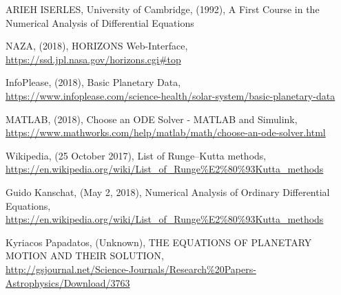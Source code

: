 \documentclass[a4paper]{article}
\begin{document}
\begin{thebibliography}{9}

ARIEH ISERLES, University of Cambridge, (1992), 
A First Course in the Numerical Analysis
of Differential Equations

NAZA, (2018), HORIZONS Web-Interface,
\\\url{https://ssd.jpl.nasa.gov/horizons.cgi#top}

InfoPlease, (2018), Basic Planetary Data,
\\\url{https://www.infoplease.com/science-health/solar-system/basic-planetary-data}

MATLAB, (2018), Choose an ODE Solver - MATLAB and Simulink,
\\\url{https://www.mathworks.com/help/matlab/math/choose-an-ode-solver.html}

Wikipedia, (25 October 2017), List of Runge–Kutta methods,
\\\url{https://en.wikipedia.org/wiki/List_of_Runge%E2%80%93Kutta_methods}

Guido Kanschat, (May 2, 2018), Numerical Analysis of Ordinary Differential Equations,
\\\url{https://en.wikipedia.org/wiki/List_of_Runge%E2%80%93Kutta_methods}

Kyriacos Papadatos, (Unknown), THE EQUATIONS OF PLANETARY MOTION AND THEIR SOLUTION,
\\\url{http://gsjournal.net/Science-Journals/Research%20Papers-Astrophysics/Download/3763}


\end{thebibliography}

\pagebreak

\begin{appendices}

\end{appendices}
\end{document}
